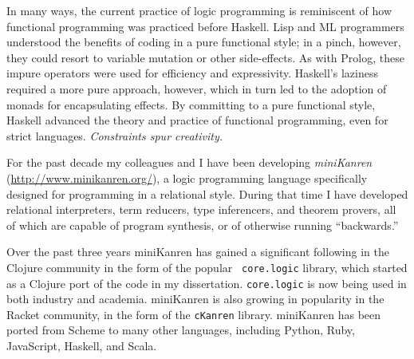 In many ways, the current practice of logic programming is reminiscent
of how functional programming was practiced before Haskell.  Lisp and
ML programmers understood the benefits of coding in a pure functional
style; in a pinch, however, they could resort to variable mutation or
other side-effects.  As with Prolog, these impure operators were used
for efficiency and expressivity.  Haskell's laziness required a more
pure approach, however, which in turn led to the adoption of monads
for encapsulating effects.  By committing to a pure functional style,
Haskell advanced the theory and practice of functional programming,
even for strict languages.
%
\emph{Constraints spur creativity.}

For the past decade my colleagues and I have been developing
\emph{miniKanren} (\url{http://www.minikanren.org/}), a logic programming
language specifically designed for programming in a relational style.
%
During that time I have developed relational interpreters, term
reducers, type inferencers, and theorem provers, all of which are
capable of program synthesis, or of otherwise running ``backwards.''

Over the past three years miniKanren has gained a significant
following in the Clojure community in the form of the popular {\tt
  core.logic} library, which started as a Clojure port of the code in
my dissertation.  {\tt core.logic} is now being used in both industry
and academia.  miniKanren is also growing in popularity in the Racket
community, in the form of the {\tt cKanren} library. miniKanren has
been ported from Scheme to many other languages, including Python,
Ruby, JavaScript, Haskell, and Scala.
